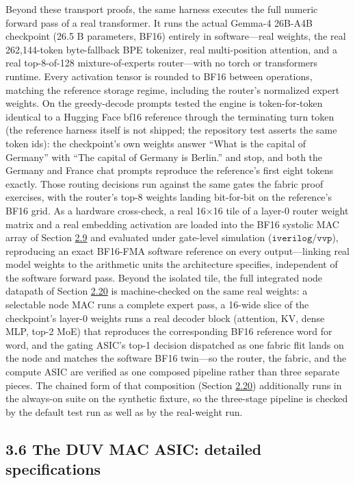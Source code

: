 \documentclass[10pt,twocolumn]{article}
\begin{document}
Beyond these transport proofs, the same harness executes the full numeric forward pass of a real transformer. It runs the actual Gemma-4 26B-A4B checkpoint (26.5 B parameters, BF16) entirely in software---real weights, the real 262{,}144-token byte-fallback BPE tokenizer, real multi-position attention, and a real top-8-of-128 mixture-of-experts router---with no torch or transformers runtime. Every activation tensor is rounded to BF16 between operations, matching the reference storage regime, including the router's normalized expert weights. On the greedy-decode prompts tested the engine is token-for-token identical to a Hugging Face bf16 reference through the terminating turn token (the reference harness itself is not shipped; the repository test asserts the same token ids): the checkpoint's own weights answer ``What is the capital of Germany'' with ``The capital of Germany is Berlin.'' and stop, and both the Germany and France chat prompts reproduce the reference's first eight tokens exactly. Those routing decisions run against the same gates the fabric proof exercises, with the router's top-8 weights landing bit-for-bit on the reference's BF16 grid. As a hardware cross-check, a real 16$\times$16 tile of a layer-0 router weight matrix and a real embedding activation are loaded into the BF16 systolic MAC array of Section \hyperref[sec:2.9]{2.9} and evaluated under gate-level simulation ($\texttt{iverilog}$/$\texttt{vvp}$), reproducing an exact BF16-FMA software reference on every output---linking real model weights to the arithmetic units the architecture specifies, independent of the software forward pass. Beyond the isolated tile, the full integrated node datapath of Section \hyperref[sec:2.20]{2.20} is machine-checked on the same real weights: a selectable node MAC runs a complete expert pass, a 16-wide slice of the checkpoint's layer-0 weights runs a real decoder block (attention, KV, dense MLP, top-2 MoE) that reproduces the corresponding BF16 reference word for word, and the gating ASIC's top-1 decision dispatched as one fabric flit lands on the node and matches the software BF16 twin---so the router, the fabric, and the compute ASIC are verified as one composed pipeline rather than three separate pieces. The chained form of that composition (Section \hyperref[sec:2.20]{2.20}) additionally runs in the always-on suite on the synthetic fixture, so the three-stage pipeline is checked by the default test run as well as by the real-weight run.

\subsection*{3.6 The DUV MAC ASIC: detailed specifications}\label{sec:3.6}
\end{document}
